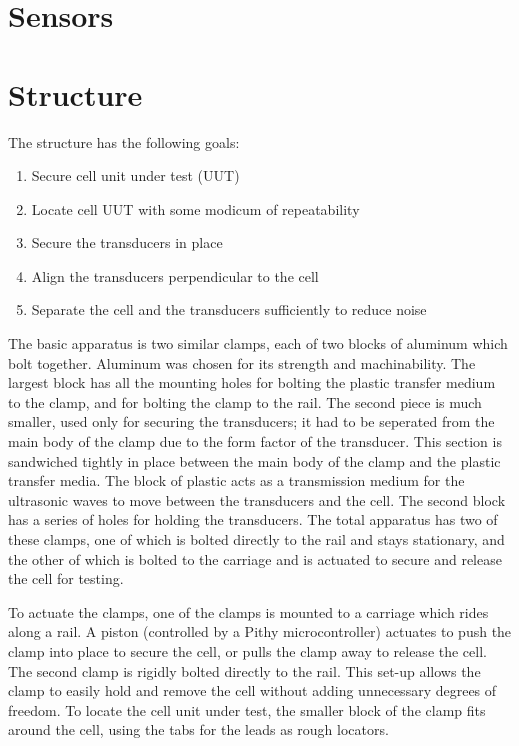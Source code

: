 \section{Sensors}

\section{Structure}
The structure has the following goals:
\begin{enumerate}
    \item Secure cell unit under test (UUT)
    \item Locate cell UUT with some modicum of repeatability
    \item Secure the transducers in place
    \item Align the transducers perpendicular to the cell
    \item Separate the cell and the transducers sufficiently to reduce noise
\end{enumerate}

The basic apparatus is two similar clamps, each of two blocks of aluminum which bolt together. Aluminum was chosen for its strength and machinability. The largest block has all the mounting holes for bolting the plastic transfer medium to the clamp, and for bolting the clamp to the rail. The second piece is much smaller, used only for securing the transducers; it had to be seperated from the main body of the clamp due to the form factor of the transducer. This section is sandwiched tightly in place between the main body of the clamp and the plastic transfer media. The block of plastic acts as a transmission medium for the ultrasonic waves to move between the transducers and the cell. The second block has a series of holes for holding the transducers. The total apparatus has two of these clamps, one of which is bolted directly to the rail and stays stationary, and the other of which is bolted to the carriage and is actuated to secure and release the cell for testing.

To actuate the clamps, one of the clamps is mounted to a carriage which rides along a rail. A piston (controlled by a Pithy microcontroller) actuates to push the clamp into place to secure the cell, or pulls the clamp away to release the cell. The second clamp is rigidly bolted directly to the rail. This set-up allows the clamp to easily hold and remove the cell without adding unnecessary degrees of freedom. To locate the cell unit under test, the smaller block of the clamp fits around the cell, using the tabs for the leads as rough locators.

